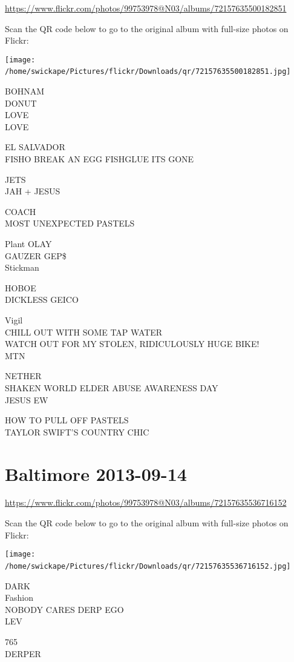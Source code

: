 \documentclass[10pt,letterpaper]{article}
\begin{document}
\url{https://www.flickr.com/photos/99753978@N03/albums/72157635500182851}

Scan the QR code below to go to the original album with full-size photos on Flickr:

\texttt{[image: /home/swickape/Pictures/flickr/Downloads/qr/72157635500182851.jpg]}
\

BOHNAM\\
DONUT\\
LOVE\\
LOVE

EL SALVADOR\\
FISHO BREAK AN EGG FISHGLUE ITS GONE

JETS\\
JAH + JESUS

COACH\\
MOST UNEXPECTED PASTELS

Plant OLAY\\
GAUZER GEP\$\\
Stickman

HOBOE\\
DICKLESS GEICO

Vigil\\
CHILL OUT WITH SOME TAP WATER\\
WATCH OUT FOR MY STOLEN, RIDICULOUSLY HUGE BIKE!\\
MTN

NETHER\\
SHAKEN WORLD ELDER ABUSE AWARENESS DAY\\
JESUS EW

HOW TO PULL OFF PASTELS\\
TAYLOR SWIFT'S COUNTRY CHIC
\

\section*{Baltimore 2013-09-14}

\url{https://www.flickr.com/photos/99753978@N03/albums/72157635536716152}

Scan the QR code below to go to the original album with full-size photos on Flickr:

\texttt{[image: /home/swickape/Pictures/flickr/Downloads/qr/72157635536716152.jpg]}
\

DARK\\
Fashion\\
NOBODY CARES DERP EGO\\
LEV

765\\
DERPER
\end{document}
